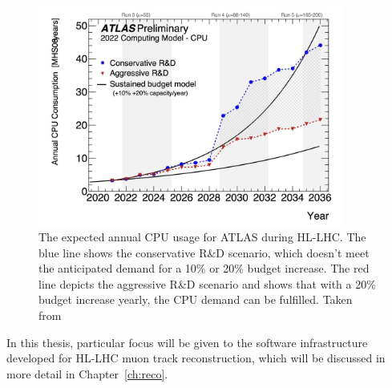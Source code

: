 \begin{figure}[pht]
    \centering
    \includegraphics[width=0.9\textwidth]{figures/atlas/atlas_cpu_usage.png}
    \caption{The expected annual CPU usage for ATLAS during HL-LHC\@. The blue line shows the conservative R\&D scenario, which doesn't meet the anticipated demand for a 10\% or 20\% budget increase. The red line depicts the aggressive R\&D scenario and shows that with a 20\% budget increase yearly, the CPU demand can be fulfilled. Taken from~\cite{CERN-LHCC-2022-005}
    }\label{fig:atlas_cpu_usage}
\end{figure}

In this thesis, particular focus will be given to the software infrastructure developed for HL-LHC muon track reconstruction, which will be discussed in more detail in Chapter~\ref{ch:reco}.
